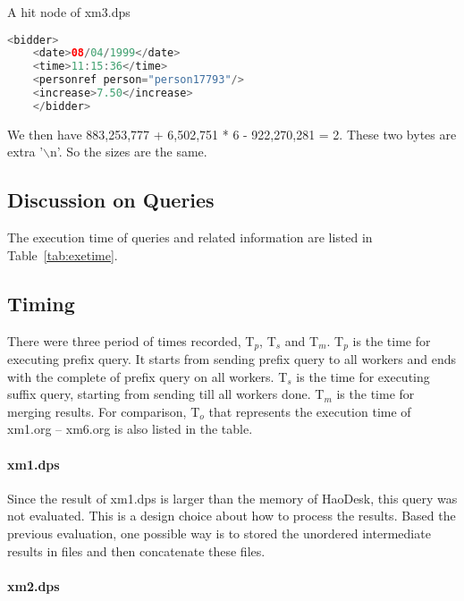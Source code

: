 \begin{table}
	\centering
	\label{code:bidder}
	\caption{A hit node of xm3.dps}
	\footnotesize
	\begin{lstlisting}[language=java,frame=single]
	<bidder>
	<date>08/04/1999</date>
	<time>11:15:36</time>
	<personref person="person17793"/>
	<increase>7.50</increase>
	</bidder>
	\end{lstlisting}
\end{table}



We then have 883,253,777 + 6,502,751 * 6 - 922,270,281 = 2. These two bytes are
extra '$\backslash$n'. So the sizes are the same.



\subsection{Discussion on Queries}

The execution time of queries and related information are listed in
Table~\ref{tab:exetime}.

\subsection{Timing}

There were three period of times recorded, T$_p$, T$_s$ and T$_m$. T$_p$ is the
time for executing prefix query. It starts from sending  prefix query to all
workers and ends with the complete of prefix query on all workers.
T$_s$ is the time for executing suffix query, starting from sending till all
workers done. T$_m$ is the time for merging results.
For comparison, T$_o$ that represents the execution time of xm1.org -- xm6.org 
is also listed in the table.

\paragraph{xm1.dps}

Since the result of xm1.dps is larger than the memory of HaoDesk, this query was
not evaluated. This is a design  choice about how to process the results. Based
the previous evaluation, one possible way is to stored the unordered
intermediate results in files and then concatenate these files.

\paragraph{xm2.dps}

